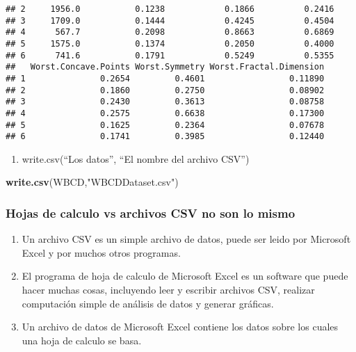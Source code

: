 \documentclass[]{article}
\newenvironment{Shaded}{\begin{snugshade}}{\end{snugshade}}
\newcommand{\KeywordTok}[1]{\textcolor[rgb]{0.13,0.29,0.53}{\textbf{#1}}}
\newcommand{\NormalTok}[1]{#1}
\newcommand{\StringTok}[1]{\textcolor[rgb]{0.31,0.60,0.02}{#1}}
\providecommand{\tightlist}{%
  \setlength{\itemsep}{0pt}\setlength{\parskip}{0pt}}
\begin{document}
\begin{verbatim}
## 2     1956.0           0.1238            0.1866          0.2416
## 3     1709.0           0.1444            0.4245          0.4504
## 4      567.7           0.2098            0.8663          0.6869
## 5     1575.0           0.1374            0.2050          0.4000
## 6      741.6           0.1791            0.5249          0.5355
##   Worst.Concave.Points Worst.Symmetry Worst.Fractal.Dimension
## 1               0.2654         0.4601                 0.11890
## 2               0.1860         0.2750                 0.08902
## 3               0.2430         0.3613                 0.08758
## 4               0.2575         0.6638                 0.17300
## 5               0.1625         0.2364                 0.07678
## 6               0.1741         0.3985                 0.12440
\end{verbatim}

\begin{enumerate}
\def\labelenumi{\arabic{enumi}.}
\setcounter{enumi}{1}
\tightlist
\item
  write.csv(``Los datos'', ``El nombre del archivo CSV'')
\end{enumerate}

\begin{Shaded}
\begin{Highlighting}[]
\KeywordTok{write.csv}\NormalTok{(WBCD,}\StringTok{"WBCDDataset.csv"}\NormalTok{)}
\end{Highlighting}
\end{Shaded}

\hypertarget{hojas-de-calculo-vs-archivos-csv-no-son-lo-mismo}{%
\subsubsection{Hojas de calculo vs archivos CSV no son lo
mismo}\label{hojas-de-calculo-vs-archivos-csv-no-son-lo-mismo}}

\begin{enumerate}
\def\labelenumi{\arabic{enumi}.}
\tightlist
\item
  Un archivo CSV es un simple archivo de datos, puede ser leido por
  Microsoft Excel y por muchos otros programas.
\item
  El programa de hoja de calculo de Microsoft Excel es un software que
  puede hacer muchas cosas, incluyendo leer y escribir archivos CSV,
  realizar computación simple de análisis de datos y generar gráficas.
\item
  Un archivo de datos de Microsoft Excel contiene los datos sobre los
  cuales una hoja de calculo se basa.
\end{enumerate}
\end{document}
